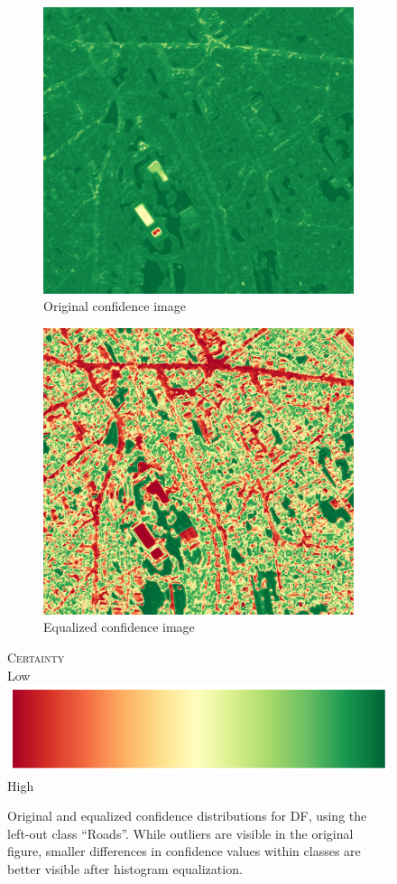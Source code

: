 \documentclass[10pt]{article}
\newcommand{\legendCert}{
    Low \includegraphics[height=.8\baselineskip]{colorbar} High
    }
\begin{document}
\begin{figure}[H]
\begin{subfigure}{.45\textwidth}
        \includegraphics[width=\textwidth]{Figures/ZH_wo_cl_1_df_im_1}
        \caption{Original confidence image}
        \label{subfig:original-im}
    \end{subfigure}
    \begin{subfigure}{.45\textwidth}
        \centering
        \includegraphics[width=\textwidth]{ZH_wo_cl_1_df_im_1_eq}
        \caption{Equalized confidence image}
        \label{subfig:equalized-im}
    \end{subfigure}
    \textsc{Certainty}\\[.2cm]
    \legendCert
    \caption{Original and equalized confidence distributions for \gls{DF}, using the left-out class ``Roads''. While outliers are visible in the original figure, smaller differences in confidence values within classes are better visible after histogram equalization.}
    \label{fig:hist-eq}
\end{figure}
\end{document}
